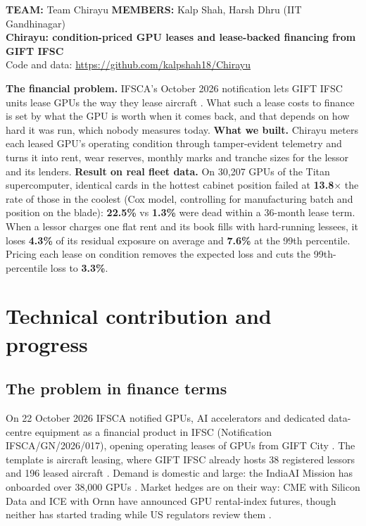 \documentclass[10pt]{article}
\newcommand{\num}[1]{\textbf{#1}}
\begin{document}
{\color{ink}\noindent
{\footnotesize\textbf{TEAM:} Team Chirayu \quad\textbf{MEMBERS:} Kalp Shah, Harsh Dhru (IIT Gandhinagar)}\\[3pt]
{\LARGE\bfseries Chirayu: condition-priced GPU leases and lease-backed financing from GIFT IFSC}\\[2pt]
{\small Code and data: \url{https://github.com/kalpshah18/Chirayu}}}
\vspace{4pt}

\begin{tcolorbox}[colback=soft,colframe=accent,boxrule=0.6pt,arc=2pt,left=6pt,right=6pt,top=4pt,bottom=4pt]
\small
\textbf{The financial problem.} IFSCA's October 2026 notification lets GIFT IFSC units lease GPUs the way they lease aircraft \cite{ifsca}. What such a lease costs to finance is set by what the GPU is worth when it comes back, and that depends on how hard it was run, which nobody measures today.
\textbf{What we built.} Chirayu meters each leased GPU's operating condition through tamper-evident telemetry and turns it into rent, wear reserves, monthly marks and tranche sizes for the lessor and its lenders.
\textbf{Result on real fleet data.} On 30,207 GPUs of the Titan supercomputer, identical cards in the hottest cabinet position failed at \num{13.8$\times$} the rate of those in the coolest (Cox model, controlling for manufacturing batch and position on the blade): \num{22.5\%} vs \num{1.3\%} were dead within a 36-month lease term. When a lessor charges one flat rent and its book fills with hard-running lessees, it loses \num{4.3\%} of its residual exposure on average and \num{7.6\%} at the 99th percentile. Pricing each lease on condition removes the expected loss and cuts the 99th-percentile loss to \num{3.3\%}.
\end{tcolorbox}

\section{Technical contribution and progress}

\subsection{The problem in finance terms}
On 22 October 2026 IFSCA notified GPUs, AI accelerators and dedicated data-centre equipment as a financial product in IFSC (Notification IFSCA/GN/2026/017), opening operating leases of GPUs from GIFT City \cite{ifsca}. The template is aircraft leasing, where GIFT IFSC already hosts 38 registered lessors and 196 leased aircraft \cite{kpmg}. Demand is domestic and large: the IndiaAI Mission has onboarded over 38,000 GPUs \cite{indiaai}. Market hedges are on their way: CME with Silicon Data and ICE with Ornn have announced GPU rental-index futures, though neither has started trading while US regulators review them \cite{cme,ice}.
\end{document}

